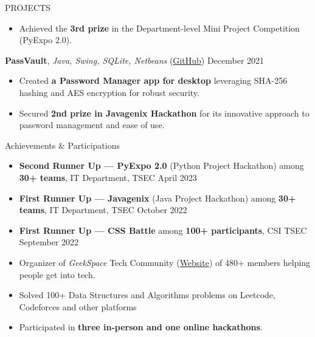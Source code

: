 \documentclass{resume} %
\begin{document}
\begin{rSection}{PROJECTS}
\begin{itemize}
     \item Achieved the \textbf{3rd prize} in the Department-level Mini Project Competition (PyExpo 2.0).
 \end{itemize}
\item \textbf{PassVault}, \textit{Java, Swing, SQLite, Netbeans} (\href{https://github.com/ninadnaik10/PassVault} {GitHub}) \hfill {December 2021} 
\begin{itemize}
    \setlength\itemsep{-0.6em} 
     \item Created \textbf{a Password Manager app for desktop} leveraging SHA-256 hashing and AES encryption for robust security. 
     \item Secured \textbf{2nd prize in Javagenix Hackathon} for its innovative approach to password management and ease of use.
 \end{itemize}

\end{rSection} 

\begin{rSection}{Achievements \& Participations} 
\begin{itemize}
\setlength\itemsep{-0.6em}
    \item \textbf{Second Runner Up — PyExpo 2.0} (Python Project Hackathon) among \textbf{30+ teams}, IT Department, TSEC \hfill {April 2023}
    \item \textbf{First Runner Up — Javagenix} (Java Project Hackathon) among \textbf{30+ teams}, IT Department, TSEC \hfill {October 2022}
    \item \textbf{First Runner Up — CSS Battle} among \textbf{100+ participants}, CSI TSEC \hfill {September 2022}
    \item Organizer of \textit{GeekSpace} Tech Community (\href{https://geekspaceclub.xyz}{Website}) of 480+ members helping people get into tech.
    \item Solved 100+ Data Structures and Algorithms problems on Leetcode, Codeforces and other platforms
    \item Participated in \textbf{three in-person and one online hackathons}.
\end{itemize}


\end{rSection}



\end{document}
